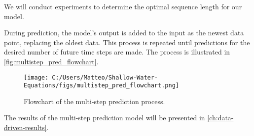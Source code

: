 We will conduct experiments to determine the optimal sequence length for our model.

During prediction, the model's output is added to the input as the newest data point, replacing the oldest data.
This process is repeated until predictions for the desired number of future time steps are made.
The process is illustrated in \autoref{fig:multistep_pred_flowchart}.
\begin{figure}[H]
    \centering
    \texttt{[image: C:/Users/Matteo/Shallow-Water-Equations/figs/multistep\_pred\_flowchart.png]}
    \caption{Flowchart of the multi-step prediction process.}\label{fig:multistep_pred_flowchart}
\end{figure}
The results of the multi-step prediction model will be presented in \autoref{ch:data-driven-results}.




